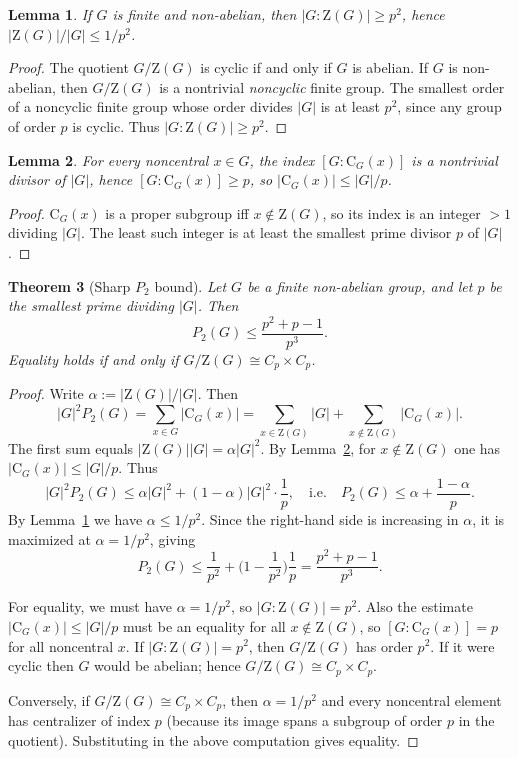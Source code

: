 \documentclass[11pt]{article}
\newtheorem{theorem}{Theorem}[section]
\newtheorem{lemma}[theorem]{Lemma}
\theoremstyle{definition}
\theoremstyle{remark}
\theoremstyle{definition}
\theoremstyle{plain}
\newcommand{\Z}{\mathrm{Z}}
\newcommand{\C}{\mathrm{C}}
\begin{document}
\begin{lemma}\label{lem:centerindex}
If $G$ is finite and non-abelian, then $|G:\Z(G)|\ge p^2$, hence $|\Z(G)|/|G|\le 1/p^2$.
\end{lemma}

\begin{proof}
The quotient $G/\Z(G)$ is cyclic if and only if $G$ is abelian.
If $G$ is non-abelian, then $G/\Z(G)$ is a nontrivial \emph{noncyclic} finite group.
The smallest order of a noncyclic finite group whose order divides $|G|$ is at least $p^2$,
since any group of order $p$ is cyclic.
Thus $|G:\Z(G)|\ge p^2$.
\end{proof}

\begin{lemma}\label{lem:centralizerindexp}
For every noncentral $x\in G$, the index $[G:\C_G(x)]$ is a nontrivial divisor of $|G|$,
hence $[G:\C_G(x)]\ge p$, so $|\C_G(x)|\le |G|/p$.
\end{lemma}

\begin{proof}
$\C_G(x)$ is a proper subgroup iff $x\notin \Z(G)$, so its index is an integer $>1$
dividing $|G|$. The least such integer is at least the smallest prime divisor $p$ of $|G|$.
\end{proof}

\begin{theorem}[Sharp $P_2$ bound]\label{thm:P2bound}
Let $G$ be a finite non-abelian group, and let $p$ be the smallest prime dividing $|G|$.
Then
\[
P_2(G)\le \frac{p^2+p-1}{p^3}.
\]
Equality holds if and only if $G/\Z(G)\cong C_p\times C_p$.
\end{theorem}

\begin{proof}
Write $\alpha:=|\Z(G)|/|G|$. Then
\[
|G|^2P_2(G)=\sum_{x\in G} |\C_G(x)|
=\sum_{x\in \Z(G)}|G|+\sum_{x\notin \Z(G)}|\C_G(x)|.
\]
The first sum equals $|\Z(G)||G|=\alpha |G|^2$.
By Lemma~\ref{lem:centralizerindexp}, for $x\notin\Z(G)$ one has $|\C_G(x)|\le |G|/p$.
Thus
\[
|G|^2P_2(G)\le \alpha |G|^2 + (1-\alpha)|G|^2\cdot \frac{1}{p},
\quad\text{i.e.}\quad
P_2(G)\le \alpha + \frac{1-\alpha}{p}.
\]
By Lemma~\ref{lem:centerindex} we have $\alpha\le 1/p^2$. Since the right-hand side is
increasing in $\alpha$, it is maximized at $\alpha=1/p^2$, giving
\[
P_2(G)\le \frac{1}{p^2}+\Big(1-\frac{1}{p^2}\Big)\frac{1}{p}
=\frac{p^2+p-1}{p^3}.
\]

For equality, we must have $\alpha=1/p^2$, so $|G:\Z(G)|=p^2$.
Also the estimate $|\C_G(x)|\le |G|/p$ must be an equality for all $x\notin\Z(G)$, so
$[G:\C_G(x)]=p$ for all noncentral $x$.
If $|G:\Z(G)|=p^2$, then $G/\Z(G)$ has order $p^2$. If it were cyclic then $G$ would be abelian;
hence $G/\Z(G)\cong C_p\times C_p$.

Conversely, if $G/\Z(G)\cong C_p\times C_p$, then $\alpha=1/p^2$ and every noncentral element
has centralizer of index $p$ (because its image spans a subgroup of order $p$ in the quotient).
Substituting in the above computation gives equality.
\end{proof}
\end{document}
